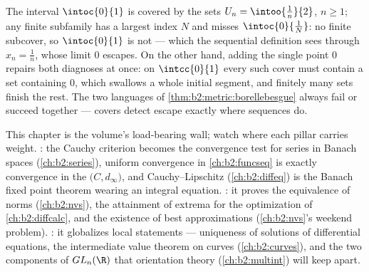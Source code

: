 \begin{example}\label{ex:b2:metric:covers}
The  interval $\intoc{0}{1}$ is covered by the  sets
$U_n = \intoo{\frac1n}{2}$, $n \geq 1$; any finite subfamily has a
largest index $N$ and misses $\intoc{0}{\frac1N}$: no finite
subcover, so $\intoc{0}{1}$ is not  --- which the
sequential definition sees through $x_n = \frac1n$, whose limit
$0$ escapes. On the other hand, adding the single point $0$
repairs both diagnoses at once: on $\intcc{0}{1}$ every such cover
must contain a set containing $0$, which swallows a whole initial
segment, and finitely many sets finish the rest. The two languages
of \cref{thm:b2:metric:borellebesgue} always fail or succeed
together --- covers detect escape exactly where sequences do.
\end{example}

\begin{remark}\label{rem:b2:metric:perspectives}
This chapter is the volume's load-bearing wall; watch where
each pillar carries weight. \emph{}: the Cauchy
criterion becomes the convergence test for series in Banach
spaces (\cref{ch:b2:series}), uniform convergence in
\cref{ch:b2:funcseq} is exactly convergence in the 
$\bigl(C, d_\infty\bigr)$, and Cauchy--Lipschitz
(\cref{ch:b2:diffeq}) is the Banach fixed point theorem wearing
an integral equation. \emph{}: it proves the
equivalence of norms (\cref{ch:b2:nvs}), the attainment of
extrema for the optimization of \cref{ch:b2:diffcalc}, and the
existence of best approximations (\cref{ch:b2:nvs}'s weekend
problem). \emph{}: it globalizes local statements
--- uniqueness of solutions of differential equations, the
intermediate value theorem on curves (\cref{ch:b2:curves}), and
the two components of $GL_n(\R)$ that orientation theory
(\cref{ch:b2:multint}) will keep apart.
\end{remark}

